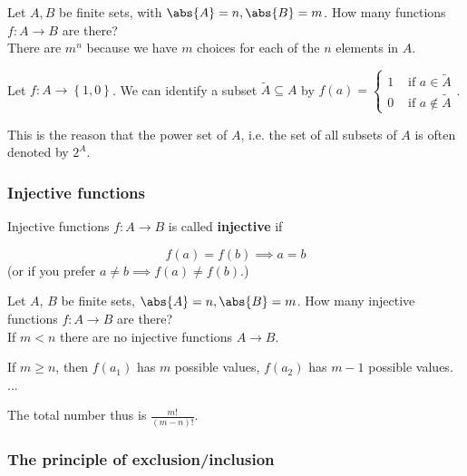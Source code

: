 \documentclass[english]{lbscript}
\begin{document}
\begin{proposition}{}{}
Let \(A, B\) be finite sets, with \(\abs{A}=n, \abs{B}=m\). How many functions \(f:A→B\) are there?\\
There are \(m^{n}\) because we have \(m\) choices for each of the \(n\) elements in \(A\).
\end{proposition}

\begin{remark}{}{}
  Let \(f: A → \left\{ 1, 0 \right\} \). We can identify a subset \(\tilde{A}⊆A\) by \(f(a) = \begin{cases} 1 & \text{ if } a∈\tilde{A} \\ 0 & \text{ if } a ∉ \tilde{A} \end{cases}\).

  This is the reason that the power set of \(A\), i.e. the set of all subsets of \(A\) is often denoted by \(2^{A}\).
\end{remark}

\subsubsection{Injective functions}
\label{sec:injective-functions}

\begin{definition}{Injective functions}{}
  \(f:A→B\) is called \textbf{injective} if

\begin{equation}
\label{eq:6}
f(a)=f(b)⟹ a=b
\end{equation}
(or if you prefer \(a≠b⟹f(a)≠f(b)\).)
\end{definition}

\begin{proposition}{}{}
  Let \(A\), \(B\) be finite sets, \(\abs{A}=n, \abs{B}=m\). How many injective functions \(f:A→B\) are there?\\

  If \(m<n\) there are no injective functions \(A→B\).

  If \(m≥n\), then \(f(a_1)\) has \(m\) possible values, \(f(a_2)\) has \(m-1\) possible values. ...

  The total number thus is \(\frac{m!}{(m-n)!}\).
\end{proposition}

\subsubsection{The principle of exclusion/inclusion}
\label{sec:princ-excl}
\end{document}
